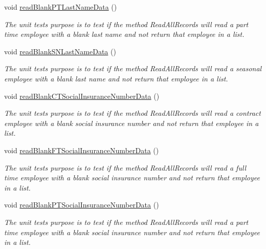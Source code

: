\begin{DoxyCompactItemize}
void \hyperlink{class_file_i_o_tests_1_1_file_i_o_tests_a4633a95ed1e16bac8d2a527db223cee9}{read\+Blank\+P\+T\+Last\+Name\+Data} ()
\begin{DoxyCompactList}\small\item\em The unit test\textquotesingle{}s purpose is to test if the method Read\+All\+Records will read a part time employee with a blank last name and not return that employee in a list. \end{DoxyCompactList}\item 
void \hyperlink{class_file_i_o_tests_1_1_file_i_o_tests_a9479915b9a0b60beb1048ae3f152e33e}{read\+Blank\+S\+N\+Last\+Name\+Data} ()
\begin{DoxyCompactList}\small\item\em The unit test\textquotesingle{}s purpose is to test if the method Read\+All\+Records will read a seasonal employee with a blank last name and not return that employee in a list. \end{DoxyCompactList}\item 
void \hyperlink{class_file_i_o_tests_1_1_file_i_o_tests_a78d8b209df47110978848dc89257466d}{read\+Blank\+C\+T\+Social\+Insurance\+Number\+Data} ()
\begin{DoxyCompactList}\small\item\em The unit test\textquotesingle{}s purpose is to test if the method Read\+All\+Records will read a contract employee with a blank social insurance number and not return that employee in a list. \end{DoxyCompactList}\item 
void \hyperlink{class_file_i_o_tests_1_1_file_i_o_tests_a92f0c3877551434af09c16d14906228d}{read\+Blank\+F\+T\+Social\+Insurance\+Number\+Data} ()
\begin{DoxyCompactList}\small\item\em The unit test\textquotesingle{}s purpose is to test if the method Read\+All\+Records will read a full time employee with a blank social insurance number and not return that employee in a list. \end{DoxyCompactList}\item 
void \hyperlink{class_file_i_o_tests_1_1_file_i_o_tests_a48c165b62517080564d9cfd03496ab3a}{read\+Blank\+P\+T\+Social\+Insurance\+Number\+Data} ()
\begin{DoxyCompactList}\small\item\em The unit test\textquotesingle{}s purpose is to test if the method Read\+All\+Records will read a part time employee with a blank social insurance number and not return that employee in a list. \end{DoxyCompactList}\item 

\end{DoxyCompactItemize}

